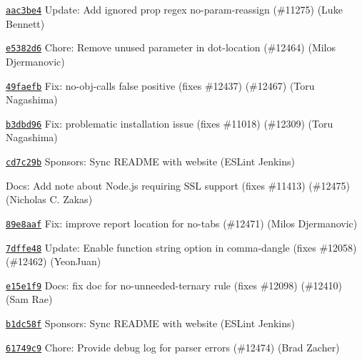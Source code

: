 \begin{DoxyItemize}
\item \href{https://github.com/eslint/eslint/commit/aac3be435cccc241781150fcac728df04d086fa8}{\texttt{ {\ttfamily aac3be4}}} Update\+: Add ignored prop regex no-\/param-\/reassign (\#11275) (Luke Bennett)
\item \href{https://github.com/eslint/eslint/commit/e5382d6e4eb1344f537b6f107535269e9939fcb8}{\texttt{ {\ttfamily e5382d6}}} Chore\+: Remove unused parameter in dot-\/location (\#12464) (Milos Djermanovic)
\item \href{https://github.com/eslint/eslint/commit/49faefbee3fc7daaf2482d9d7d23513d6ffda9e8}{\texttt{ {\ttfamily 49faefb}}} Fix\+: no-\/obj-\/calls false positive (fixes \#12437) (\#12467) (Toru Nagashima)
\item \href{https://github.com/eslint/eslint/commit/b3dbd9657bbeac6571111a4429b03fc085ba6655}{\texttt{ {\ttfamily b3dbd96}}} Fix\+: problematic installation issue (fixes \#11018) (\#12309) (Toru Nagashima)
\item \href{https://github.com/eslint/eslint/commit/cd7c29b17085c14c9cf6345201c72a192c0d0e0c}{\texttt{ {\ttfamily cd7c29b}}} Sponsors\+: Sync README with website (ESLint Jenkins)
\item \href{https://github.com/eslint/eslint/commit/8233873b8e5facd80ab7b172bff1e896a9c5fd39}{\texttt{ {}}} Docs\+: Add note about Node.\+js requiring SSL support (fixes \#11413) (\#12475) (Nicholas C. Zakas)
\item \href{https://github.com/eslint/eslint/commit/89e8aafcc622a4763bed6b9d62f148ef95798f38}{\texttt{ {\ttfamily 89e8aaf}}} Fix\+: improve report location for no-\/tabs (\#12471) (Milos Djermanovic)
\item \href{https://github.com/eslint/eslint/commit/7dffe482d646d4e5f94fa87a22f3b5b2e0a4b189}{\texttt{ {\ttfamily 7dffe48}}} Update\+: Enable function string option in comma-\/dangle (fixes \#12058) (\#12462) (Yeon\+Juan)
\item \href{https://github.com/eslint/eslint/commit/e15e1f933f287d274a726e7f0f0a1dd80f0964af}{\texttt{ {\ttfamily e15e1f9}}} Docs\+: fix doc for no-\/unneeded-\/ternary rule (fixes \#12098) (\#12410) (Sam Rae)
\item \href{https://github.com/eslint/eslint/commit/b1dc58f0a717cb3d19300c845ca23a21ceb610d3}{\texttt{ {\ttfamily b1dc58f}}} Sponsors\+: Sync README with website (ESLint Jenkins)
\item \href{https://github.com/eslint/eslint/commit/61749c94bd8a2ebcdfb89e0cd48c4a029a945079}{\texttt{ {\ttfamily 61749c9}}} Chore\+: Provide debug log for parser errors (\#12474) (Brad Zacher)

\end{DoxyItemize}
